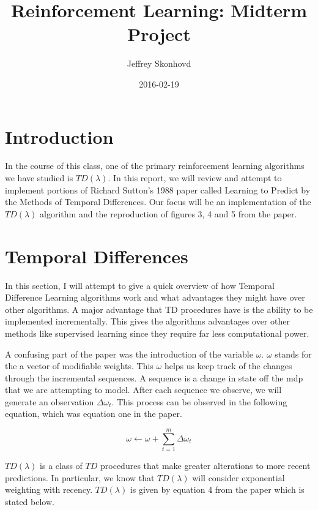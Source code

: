 \documentclass{article}
\author{Jeffrey Skonhovd}
\date{2016-02-19}
\title{Reinforcement Learning: Midterm Project}
\begin{document}
\maketitle
\tableofcontents



\section{Introduction}
\label{sec:orgheadline1}
   In the course of this class, one of the primary reinforcement learning
algorithms we have studied is \(TD(\lambda)\). In this report, we will review and
attempt to implement portions of Richard Sutton's 1988 paper called Learning to
Predict by the Methods of Temporal Differences. Our focus will be an
implementation of the \(TD(\lambda)\) algorithm and the reproduction of
figures 3, 4 and 5 from the paper. 

\section{Temporal Differences}
\label{sec:orgheadline2}
In this section, I will attempt to give a quick overview of how
Temporal Difference Learning algorithms work and what advantages they
might have over other algorithms. A major advantage that TD procedures
have is the ability to be implemented incrementally. This gives the
algorithms advantages over other methods like supervised learning
since they require far less computational power.

A confusing part of the paper was the introduction of the variable
\(\omega\). \(\omega\) stands for the a vector of modifiable weights. This
\(\omega\) helps us keep track of the changes through the incremental
sequences. A sequence is a change in state off the mdp that we are
attempting to model.  After each sequence we observe, we will generate an
observation \(\Delta\omega_{t}\). This process can be observed in the
following equation, which was equation one in the paper.

\begin{equation}
\omega \leftarrow \omega + \sum_{t=1}^{m}\Delta\omega_{t}
\end{equation}

\(TD(\lambda)\) is a class of \(TD\) procedures that make greater alterations to
more recent predictions. In particular, we know that \(TD(\lambda)\)
will consider exponential weighting with recency. \(TD(\lambda)\) is
given by equation 4 from the paper which is stated below. 
\end{document}
